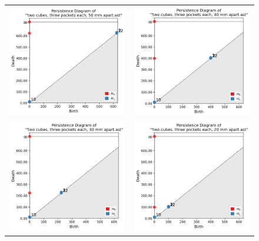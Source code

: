 \documentclass[ma]{uncgdissertationexp}
\theoremstyle{plain}
\theoremstyle{definition}
\theoremstyle{remark}
\begin{document}
\begin{figure}[H]
\begin{center}
    \begin{tabular}{cc}
         \includegraphics[width=2.5in]{Final Run, (two cubes, three pockets each, 50 mm apart) persdia.png} &
         \includegraphics[width=2.5in]{Final Run, (two cubes, three pockets each, 40 mm apart) persdia.png} \\ 
         \includegraphics[width=2.5in]{Final Run, (two cubes, three pockets each, 30 mm apart) persdia.png} &
         \includegraphics[width=2.5in]{Final Run, (two cubes, three pockets each, 20 mm apart) persdia.png} \\ 

\end{tabular}
\end{center}
\end{figure}
\end{document}
